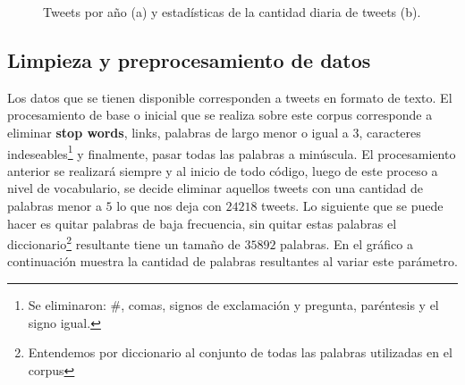 \documentclass{article}
\begin{document}
	
 	\begin{figure}[H]
 		\centering

 		\caption{Tweets por año (a) y estadísticas de la cantidad diaria de tweets (b).}
 	\end{figure}
	
\subsection{Limpieza y preprocesamiento de datos}
	Los datos que se tienen disponible corresponden a tweets en formato de texto. El procesamiento de base o inicial que se realiza sobre este corpus corresponde a eliminar \textbf{stop words}, links, palabras de largo menor o igual a $3$, caracteres indeseables\footnote{Se eliminaron: \#, comas, signos de exclamación y pregunta, paréntesis y el signo igual.} y finalmente, pasar todas las palabras a minúscula. El procesamiento anterior se realizará siempre y al inicio de todo código, luego de este proceso a nivel de vocabulario, se decide eliminar aquellos tweets con una cantidad de palabras menor a $5$ lo que nos deja con $24218$ tweets. Lo siguiente que se puede hacer es quitar palabras de baja frecuencia, sin quitar estas palabras el diccionario\footnote{Entendemos por diccionario al conjunto de todas las palabras utilizadas en el corpus} resultante tiene un tamaño de $35892$ palabras. En el gráfico a continuación muestra la cantidad de palabras resultantes al variar este parámetro.
	
\end{document}

